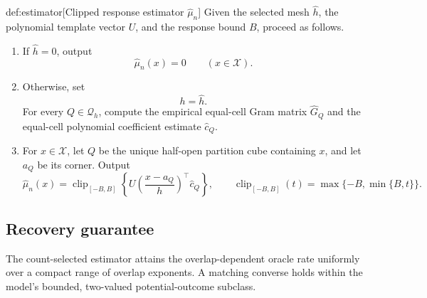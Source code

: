 \begin{algorithmv}{def:estimator}[Clipped response estimator $\widehat\mu_n$]
Given the selected mesh \(\widehat h\), the polynomial template vector \(U\), and the response bound \(B\), proceed as follows.
\begin{enumerate}
\item If \(\widehat h=0\), output
\[
\widehat\mu_n(x)=0
\qquad(x\in\mathcal X).
\]
\item Otherwise, set
\[
h=\widehat h.
\]
For every \(Q\in\mathcal Q_h\), compute the empirical equal-cell Gram matrix \(\widehat G_Q\) and the equal-cell polynomial coefficient estimate \(\widehat c_Q\).
\item For \(x\in\mathcal X\), let \(Q\) be the unique half-open partition cube containing \(x\), and let \(a_Q\) be its corner. Output
\[
\widehat\mu_n(x)
=
\operatorname{clip}_{[-B,B]}
\left\{
U\left(\frac{x-a_Q}{h}\right)^\top\widehat c_Q
\right\},
\qquad
\operatorname{clip}_{[-B,B]}(t)=\max\{-B,\min\{B,t\}\}.
\]
\end{enumerate}
\end{algorithmv}

\subsection{Recovery guarantee}

The count-selected estimator attains the overlap-dependent oracle rate uniformly over a compact range of overlap exponents. A matching converse holds within the model's bounded, two-valued potential-outcome subclass.

